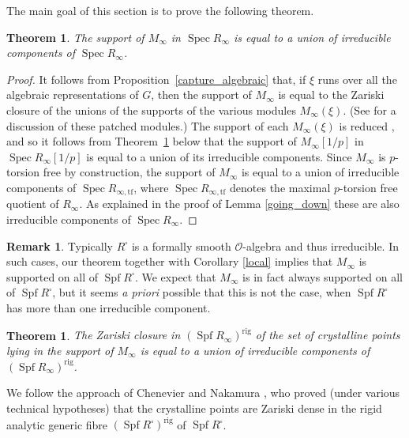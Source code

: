 \documentclass[JEP,XML,SOM,Unicode,NoEqCountersInSection]{cedram}
\let\mathcal\mathscr
\newcommand{\ssquare}{{\scriptscriptstyle\square}}
\newtheorem{thm}[prop]{Theorem}
\theoremstyle{definition}
\newtheorem{remark}[prop]{Remark}
\DeclareMathOperator{\Spf}{Spf}
\DeclareMathOperator{\Spec}{Spec}
\newcommand{\cO}{\mathcal{O}}
\newcommand\rig{\mathrm{rig}}
\begin{document}
The main goal of this section is to prove the following theorem.

\begin{thm}
\label{thm:support}
The support
of $M_{\infty}$ in $\Spec R_{\infty}$ is equal to
a union of irreducible components of $\Spec R_{\infty}$.
\end{thm}

\begin{proof}
It follows from Proposition~\ref{capture_algebraic}
that, if $\xi$ runs over all the algebraic representations
of $G$, then the support of $M_{\infty}$ is
equal to the Zariski closure of the unions of the supports
of the various modules $M_{\infty}(\xi)$.
(See \cite{six-authors} for a discussion of these patched
modules.)
The support of each $M_{\infty}(\xi)$ is reduced
\cite[Lem.\,4.17]{six-authors},
and so it follows from Theorem~\ref{rigid support}
below that the support of $M_\infty[1/p]$ in $\Spec R_{\infty}[1/p]$ is equal to
a union of its irreducible components. Since $M_{\infty}$ is $p$-torsion free
by construction, the support of $M_{\infty}$ is equal to a union of irreducible components
of $\Spec R_{\infty, \mathrm{tf}}$, where $\Spec R_{\infty, \mathrm{tf}}$ denotes the maximal
$p$-torsion free quotient of $R_{\infty}$. As explained in the proof of Lemma \ref{going_down}
these are also irreducible components of $\Spec R_{\infty}$.
\end{proof}

\begin{remark} Typically $R^\ssquare$
is a formally smooth $\cO$-algebra and thus irreducible.
In such cases, our theorem together with Corollary \ref{local} implies
that $M_{\infty}$ is supported on all of $\Spf R^\ssquare$. We expect that $M_{\infty}$ is in fact
always supported on all of $\Spf R^\ssquare$, but it seems {\em a priori}
possible that this is not the case, when $\Spf R^\ssquare$
has more than one irreducible component.
\end{remark}

\begin{thm}
\label{rigid support}
The Zariski closure in $(\Spf R_{\infty})^{\rig}$
of the set of crystalline points \hbox{lying} in the support of $M_{\infty}$ is
equal to
a union of irreducible components of $(\Spf R_{\infty})^{\rig}$.
\end{thm}

We follow the approach of Chenevier \cite{Chenevier}
and Nakamura \cite{Nakamura}, who proved (under various technical
hypotheses) that
the crystalline points are Zariski dense in the rigid analytic generic
fibre $(\Spf R^\ssquare)^{\rig}$
of $\Spf R^\ssquare$.
\end{document}
